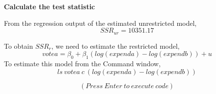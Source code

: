 \documentclass[12pt]{report}
\begin{document}
\noindent \textbf{Calculate the test statistic}

\noindent From the regression output of the estimated unrestricted model,
$$SSR_{ur} = 10351.17$$
\begin{figure}[H]
	\centering
\end{figure}
\vspace{-\baselineskip}
\noindent To obtain $SSR_r$, we need to estimate the restricted model,
$$votea = \beta_0 + \beta_1(log(expenda) - log(expendb)) + u $$
\noindent To estimate this model from the Command window,
$$ls\ votea\ c\ (log(expenda)-log(expendb))$$
\begin{figure}[H]
	\centering
\end{figure}
\vspace{-\baselineskip}
$$(Press\ Enter\ to\ execute\ code)$$
\end{document}

